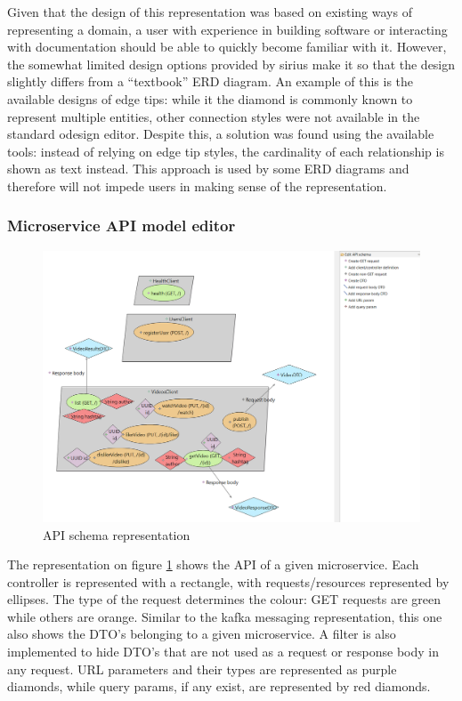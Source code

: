 \documentclass[parskip=full]{article}
\begin{document}
    Given that the design of this representation was based on existing ways of representing a domain, a user with experience in building software or interacting with documentation should be able to quickly become familiar with it.
    However, the somewhat limited design options provided by sirius make it so that the design slightly differs from a ``textbook'' ERD diagram.
    An example of this is the available designs of edge tips: while it the diamond is commonly known to represent multiple entities, other connection styles were not available in the standard odesign editor.
    Despite this, a solution was found using the available tools: instead of relying on edge tip styles, the cardinality of each relationship is shown as text instead.
    This approach is used by some ERD diagrams and therefore will not impede users in making sense of the representation.

    \subsubsection{Microservice API model editor}
    \begin{figure}
        \includegraphics[height=0.17\paperheight]{vm-api-editor-with-pallette}
        \caption{API schema representation}
        \label{fig:apiEditor}
    \end{figure}
    The representation on figure \ref{fig:apiEditor} shows the API of a given microservice.
    Each controller is represented with a rectangle, with requests/resources represented by ellipses.
    The type of the request determines the colour: GET requests are green while others are orange.
    Similar to the kafka messaging representation, this one also shows the DTO's belonging to a given microservice.
    A filter is also implemented to hide DTO's that are not used as a request or response body in any request.
    URL parameters and their types are represented as purple diamonds, while query params, if any exist, are represented by red diamonds.
\end{document}
